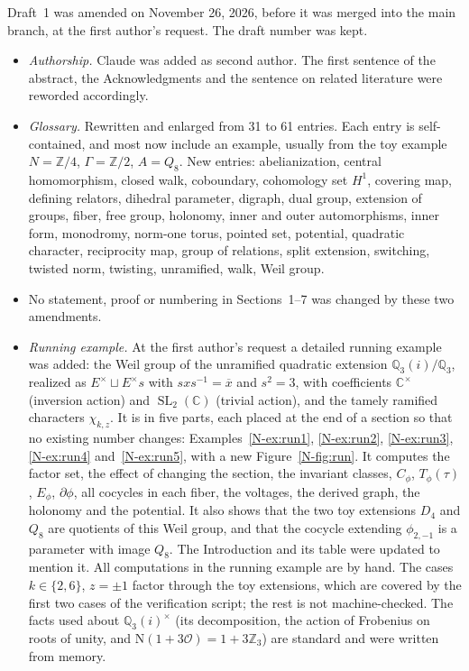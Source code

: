 \documentclass[12pt,letterpaper]{article}
\newcommand{\C}{\mathbb{C}}
\newcommand{\Z}{\mathbb{Z}}
\DeclareMathOperator{\SL}{SL}
\begin{document}
Draft~1 was amended on November 26, 2026, before it was merged into the
main branch, at the first author's request. The draft number was kept.
\begin{itemize}[itemsep=1pt]
\item \emph{Authorship.} Claude was added as second author. The first
  sentence of the abstract, the Acknowledgments and the sentence on
  related literature were reworded accordingly.
\item \emph{Glossary.} Rewritten and enlarged from 31 to 61 entries. Each
  entry is self-contained, and most now include an example, usually from
  the toy example $N=\Z/4$, $\Gamma=\Z/2$, $A=Q_8$. New entries:
  abelianization, central homomorphism, closed walk, coboundary,
  cohomology set $H^1$, covering map, defining relators, dihedral
  parameter, digraph, dual group, extension of groups, fiber, free group,
  holonomy, inner and outer automorphisms, inner form, monodromy, norm-one
  torus, pointed set, potential, quadratic character, reciprocity map,
  group of relations, split extension, switching, twisted norm, twisting,
  unramified, walk, Weil group.
\item No statement, proof or numbering in Sections~1--7 was changed by
  these two amendments.
\item \emph{Running example.} At the first author's request a detailed
  running example was added: the Weil group of the unramified quadratic
  extension $\mathbb{Q}_3(i)/\mathbb{Q}_3$, realized as
  $E^\times\sqcup E^\times s$ with $sxs^{-1}=\overline{x}$ and $s^2=3$,
  with coefficients $\C^\times$ (inversion action) and $\SL_2(\C)$
  (trivial action), and the tamely ramified characters $\chi_{k,z}$. It is
  in five parts, each placed at the end of a section so that no existing
  number changes: Examples~\ref{N-ex:run1}, \ref{N-ex:run2},
  \ref{N-ex:run3}, \ref{N-ex:run4} and~\ref{N-ex:run5}, with a new
  Figure~\ref{N-fig:run}. It computes the factor set, the effect of
  changing the section, the invariant classes, $C_\phi$, $T_\phi(\tau)$,
  $E_\phi$, $\partial\phi$, all cocycles in each fiber, the voltages, the
  derived graph, the holonomy and the potential. It also shows that the
  two toy extensions $D_4$ and $Q_8$ are quotients of this Weil group, and
  that the cocycle extending $\phi_{2,-1}$ is a parameter with image
  $Q_8$. The Introduction and its table were updated to mention it.
  All computations in the running example are by hand. The cases
  $k\in\{2,6\}$, $z=\pm1$ factor through the toy extensions, which are
  covered by the first two cases of the verification script; the rest is
  not machine-checked. The facts used about $\mathbb{Q}_3(i)^\times$ (its
  decomposition, the action of Frobenius on roots of unity, and
  $\mathrm{N}(1+3\mathcal{O})=1+3\mathbb{Z}_3$) are standard and were
  written from memory.
\end{itemize}
\end{document}

